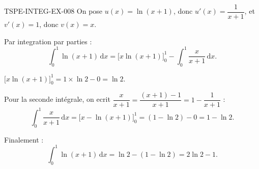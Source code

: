 \begin{corrige}{TSPE-INTEG-EX-008}
On pose $u(x)=\ln(x+1)$, donc $u'(x)=\dfrac{1}{x+1}$, et $v'(x)=1$, donc $v(x)=x$.

Par integration par parties :
\[
  \int_0^1 \ln(x+1)\,\mathrm{d}x = \big[x\ln(x+1)\big]_0^1 - \int_0^1 \frac{x}{x+1}\,\mathrm{d}x.
\]

$\big[x\ln(x+1)\big]_0^1 = 1\times\ln 2 - 0 = \ln 2$.

Pour la seconde intégrale, on ecrit $\dfrac{x}{x+1} = \dfrac{(x+1)-1}{x+1} = 1 - \dfrac{1}{x+1}$ :
\[
  \int_0^1 \frac{x}{x+1}\,\mathrm{d}x = \big[x - \ln(x+1)\big]_0^1 = (1-\ln 2) - 0 = 1-\ln 2.
\]

Finalement :
\[
  \int_0^1 \ln(x+1)\,\mathrm{d}x = \ln 2 - (1-\ln 2) = \boxed{2\ln 2 - 1}.
\]
\end{corrige}
